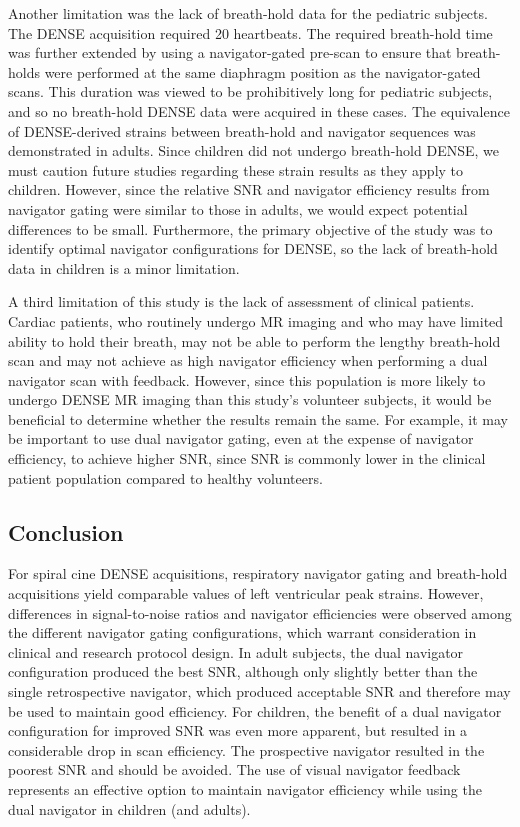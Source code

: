 	Another limitation was the lack of breath-hold data for the pediatric subjects. The DENSE acquisition required 20 heartbeats. The required breath-hold time was further extended by using a navigator-gated pre-scan to ensure that breath-holds were performed at the same diaphragm position as the navigator-gated scans. This duration was viewed to be prohibitively long for pediatric subjects, and so no breath-hold DENSE data were acquired in these cases. The equivalence of DENSE-derived strains between breath-hold and navigator sequences was demonstrated in adults. Since children did not undergo breath-hold DENSE, we must caution future studies regarding these strain results as they apply to children. However, since the relative SNR and navigator efficiency results from navigator gating were similar to those in adults, we would expect potential differences to be small. Furthermore, the primary objective of the study was to identify optimal navigator configurations for DENSE, so the lack of breath-hold data in children is a minor limitation.
	
	A third limitation of this study is the lack of assessment of clinical patients. Cardiac patients, who routinely undergo MR imaging and who may have limited ability to hold their breath, may not be able to perform the lengthy breath-hold scan and may not achieve as high navigator efficiency when performing a dual navigator scan with feedback. However, since this population is more likely to undergo DENSE MR imaging than this study's volunteer subjects, it would be beneficial to determine whether the results remain the same. For example, it may be important to use dual navigator gating, even at the expense of navigator efficiency, to achieve higher SNR, since SNR is commonly lower in the clinical patient population compared to healthy volunteers.

\subsection{Conclusion}
	For spiral cine DENSE acquisitions, respiratory navigator gating and breath-hold acquisitions yield comparable values of left ventricular peak strains. However, differences in signal-to-noise ratios and navigator efficiencies were observed among the different navigator gating configurations, which warrant consideration in clinical and research protocol design. In adult subjects, the dual navigator configuration produced the best SNR, although only slightly better than the single retrospective navigator, which produced acceptable SNR and therefore may be used to maintain good efficiency. For children, the benefit of a dual navigator configuration for improved SNR was even more apparent, but resulted in a considerable drop in scan efficiency. The prospective navigator resulted in the poorest SNR and should be avoided. The use of visual navigator feedback represents an effective option to maintain navigator efficiency while using the dual navigator in children (and adults).